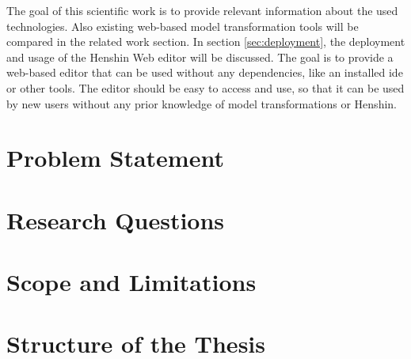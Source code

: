 The goal of this scientific work is to provide relevant information about the used technologies. Also existing web-based model transformation tools will be compared in the related work section. In section \ref{sec:deployment}, the deployment and usage of the Henshin Web editor will be discussed. The goal is to provide a web-based editor that can be used without any dependencies, like an installed \acs{ide} or other tools. The editor should be easy to access and use, so that it can be used by new users without any prior knowledge of model transformations or Henshin.

\section{Problem Statement}
\label{subsec:problem-statement}

\section{Research Questions}
\label{subsec:research-questions}

\section{Scope and Limitations}
\label{subsec:scope-limitations}

\section{Structure of the Thesis}
\label{subsec:structure-thesis}